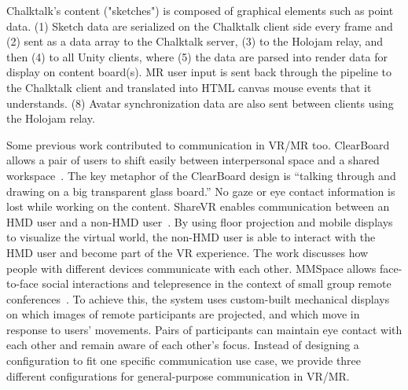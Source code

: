 \documentclass[sigchi-a]{acmart}
\begin{document}
\begin{sidebar}
 
 
 Chalktalk's content ("sketches") is composed of graphical elements such as point data. (1) Sketch data are serialized on the Chalktalk client side every frame and (2) sent as a data array to the Chalktalk server, (3) to the Holojam relay, and then (4) to all Unity clients, where (5) the data are parsed into render data for display on content board(s). MR user input is sent back through the pipeline to the Chalktalk client and translated into HTML canvas mouse events that it understands. (8) Avatar synchronization data are also sent between clients using the Holojam relay.
 
  
\end{sidebar}

Some previous work contributed to communication in VR/MR too. ClearBoard allows a pair of users to shift easily between interpersonal space and a shared workspace~\cite{ishii1993integration}.
The key metaphor of the ClearBoard design is ``talking through and drawing on a big transparent glass board.'' No gaze or eye contact information is lost while working on the content. ShareVR enables communication between an HMD user and a non-HMD user~\cite{gugenheimer2017sharevr}. By using floor projection and mobile displays to visualize the virtual world, the non-HMD user is able to interact with the HMD user and become part of the VR experience. The work discusses how people with different devices communicate with each other. MMSpace allows face-to-face social interactions and telepresence in the context of small group remote conferences~\cite{otsuka2016mmspace}. To achieve this, the system uses custom-built mechanical displays on which images of remote participants are projected, and which move in response to users' movements. Pairs of participants can maintain eye contact with each other and remain aware of each other's focus. Instead of designing a configuration to fit one specific communication use case, we provide three different configurations for general-purpose communication in VR/MR.
\end{document}
